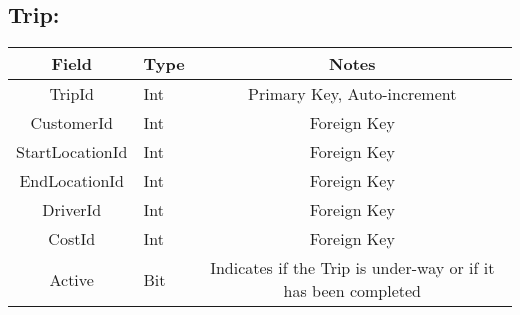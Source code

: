\documentclass[10pt, onecolumn]{witseiepaper}
\begin{document}
\subsection*{Trip:}
\begin{tabular}{|c|l|c|}
\hline 
Field & Type & Notes\\ 
\hline 
TripId & Int & Primary Key, Auto-increment\\
\hline 
CustomerId & Int & Foreign Key\\
\hline 
StartLocationId & Int & Foreign Key\\
\hline 
EndLocationId & Int & Foreign Key\\
\hline 
DriverId & Int & Foreign Key\\
\hline 
CostId & Int & Foreign Key\\
\hline 
Active & Bit & Indicates if the Trip is under-way or if it has been completed\\
\hline
\end{tabular}

%



\end{document}
